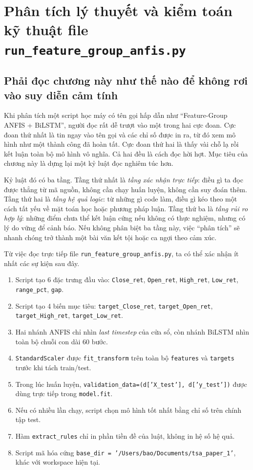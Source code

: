 \chapter{Phân tích lý thuyết và kiểm toán kỹ thuật file \texttt{run\_feature\_group\_anfis.py}}

\section{Phải đọc chương này như thế nào để không rơi vào suy diễn cảm tính}

Khi phân tích một script học máy có tên gọi hấp dẫn như ``Feature-Group ANFIS + BiLSTM'', người đọc rất dễ trượt vào một trong hai cực đoan. Cực đoan thứ nhất là tin ngay vào tên gọi và các chỉ số được in ra, từ đó xem mô hình như một thành công đã hoàn tất. Cực đoan thứ hai là thấy vài chỗ lạ rồi kết luận toàn bộ mô hình vô nghĩa. Cả hai đều là cách đọc hời hợt. Mục tiêu của chương này là dựng lại một kỷ luật đọc nghiêm túc hơn.

Kỷ luật đó có ba tầng. Tầng thứ nhất là \emph{tầng xác nhận trực tiếp}: điều gì ta đọc được thẳng từ mã nguồn, không cần chạy huấn luyện, không cần suy đoán thêm. Tầng thứ hai là \emph{tầng hệ quả logic}: từ những gì code làm, điều gì kéo theo một cách tất yếu về mặt toán học hoặc phương pháp luận. Tầng thứ ba là \emph{tầng rủi ro hợp lý}: những điểm chưa thể kết luận cứng nếu không có thực nghiệm, nhưng có lý do vững để cảnh báo. Nếu không phân biệt ba tầng này, việc ``phân tích'' sẽ nhanh chóng trở thành một bài văn kết tội hoặc ca ngợi theo cảm xúc.

Từ việc đọc trực tiếp file \texttt{run\_feature\_group\_anfis.py}, ta có thể xác nhận ít nhất các sự kiện sau đây.
\begin{enumerate}
\item Script tạo 6 đặc trưng đầu vào: \texttt{Close\_ret}, \texttt{Open\_ret}, \texttt{High\_ret}, \texttt{Low\_ret}, \texttt{range\_pct}, \texttt{gap}.
\item Script tạo 4 biến mục tiêu: \texttt{target\_Close\_ret}, \texttt{target\_Open\_ret}, \texttt{target\_High\_ret}, \texttt{target\_Low\_ret}.
\item Hai nhánh ANFIS chỉ nhìn \emph{last timestep} của cửa sổ, còn nhánh BiLSTM nhìn toàn bộ chuỗi con dài 60 bước.
\item \texttt{StandardScaler} được \texttt{fit\_transform} trên toàn bộ \texttt{features} và \texttt{targets} trước khi tách train/test.
\item Trong lúc huấn luyện, \texttt{validation\_data=(d['X\_test'], d['y\_test'])} được dùng trực tiếp trong \texttt{model.fit}.
\item Nếu có nhiều lần chạy, script chọn mô hình tốt nhất bằng chỉ số trên chính tập test.
\item Hàm \texttt{extract\_rules} chỉ in phần tiền đề của luật, không in hệ số hệ quả.
\item Script mã hóa cứng \texttt{base\_dir = '/Users/bao/Documents/tsa\_paper\_1'}, khác với workspace hiện tại.
\end{enumerate}

